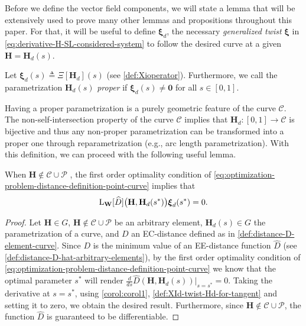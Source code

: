 Before we define the vector field components, we will state a lemma that will be extensively used to prove many other lemmas and propositions throughout this paper. For that, it will be useful to define $\boldsymbol{\xi}_d$, the necessary \emph{generalized twist} $\boldsymbol{\xi}$ in \eqref{eq:derivative-H-SL-considered-system} to follow the desired curve at a given $\mathbf{H}=\mathbf{H}_d(s)$.
\begin{definition} \label{def:XId-twist-Hd-for-tangent}
    Let $\boldsymbol{\xi}_d(s) \triangleq \Xi[\mathbf{H}_d](s)$ (see \cref{def:Xioperator}). Furthermore, we call the parametrization $\mathbf{H}_d(s)$ \emph{proper} if $\boldsymbol{\xi}_d(s) \neq \mathbf{0}$ for all $s \in [0,1]$.
    
\end{definition}
Having a proper parametrization is a purely geometric feature of the curve $\mathcal{C}$. The non-self-intersection property of the curve $\mathcal{C}$ implies that $\mathbf{H}_d: [0,1] \to \mathcal{C}$ is bijective and thus any non-proper parametrization can be transformed into a proper one through reparametrization (e.g., arc length parametrization). With this definition, we can proceed with the following useful lemma.
\begin{lemma}\label{lemma:optimization-problem-part-hdi-vanishers}
    When $\mathbf{H} \notin \mathcal{C} \cup \mathcal{P}$ , the first order optimality condition of \eqref{eq:optimization-problem-distance-definition-point-curve} implies that 
    \begin{equation}
    \textnormal{L}_{\mathbf{W}}[\widehat{D}]\bigl(\mathbf{H},\mathbf{H}_d(s^*)\bigr)\boldsymbol{\xi}_d(s^*) = 0.
    \end{equation}
\end{lemma}
\begin{proof}
    Let $\mathbf{H}\in G$, $\mathbf{H} \notin \mathcal{C} \cup \mathcal{P}$ be an arbitrary element, $\mathbf{H}_d(s)\in G$ the parametrization of a curve, and $D$ an EC-distance defined as in \cref{def:distance-D-element-curve}. Since $D$ is the minimum value of an EE-distance function $\widehat{D}$ (see \cref{def:distance-D-hat-arbitrary-elements}), by the first order optimality condition of \eqref{eq:optimization-problem-distance-definition-point-curve} we know that the optimal parameter $s^*$ will render $\frac{d}{ds}\widehat{D}(\mathbf{H}, \mathbf{H}_d(s))|_{s=s^*}=0$. Taking the derivative at $s=s^*$, using \cref{corol:corol1}, \cref{def:XId-twist-Hd-for-tangent} and setting it to zero, we obtain the desired result. Furthermore, since $\mathbf{H} \not\in \mathcal{C} \cup \mathcal{P}$, the function $\widehat{D}$ is guaranteed to be differentiable.  
\end{proof}
